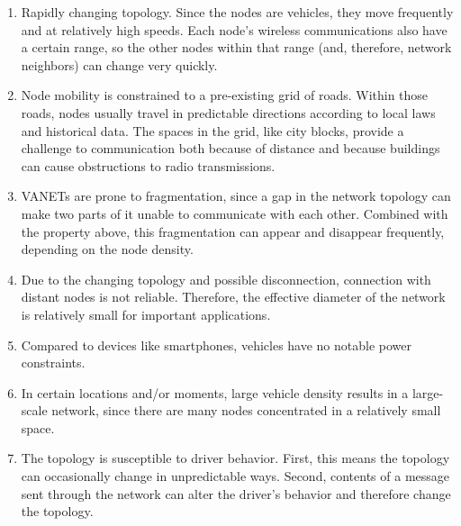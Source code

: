 \begin{enumerate}

	\item 	Rapidly changing topology.
			Since the nodes are vehicles, they move frequently and at relatively high speeds.
			Each node's wireless communications also have a certain range, so the other nodes within that range (and, therefore, network neighbors) can change very quickly.
			
	\item	Node mobility is constrained to a pre-existing grid of roads.
			Within those roads, nodes usually travel in predictable directions according to local laws and historical data.
			The spaces in the grid, like city blocks, provide a challenge to communication both because of distance and because buildings can cause obstructions to radio transmissions.
			
	\item	VANETs are prone to fragmentation, since a gap in the network topology can make two parts of it unable to communicate with each other.
			Combined with the property above, this fragmentation can appear and disappear frequently, depending on the node density.
			
	\item	Due to the changing topology and possible disconnection, connection with distant nodes is not reliable.
			Therefore, the effective diameter of the network is relatively small for important applications.
			
	\item 	Compared to devices like smartphones, vehicles have no notable power constraints.

	\item 	In certain locations and/or moments, large vehicle density results in a large-scale network, since there are many nodes concentrated in a relatively small space.
	
	\item 	The topology is susceptible to driver behavior.
			First, this means the topology can occasionally change in unpredictable ways.
			Second, contents of a message sent through the network can alter the driver's behavior and therefore change the topology.
			
\end{enumerate}

